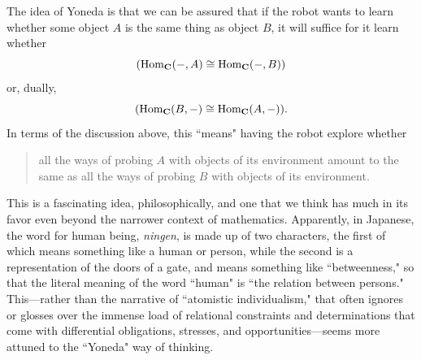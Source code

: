 \documentclass[a4paper]{book}
\theoremstyle{definition}
\theoremstyle{definition}
\theoremstyle{definition}
\theoremstyle{theorem}
\theoremstyle{definition}
\begin{document}
The idea of Yoneda is that we can be assured that if the robot wants to learn whether some object $A$ is the same thing as object $B$, it will suffice for it learn whether
\begin{equation*}
(\text{Hom}_{\textbf{C}}(\--, A) \cong  \text{Hom}_{\textbf{C}}(\--, B))  
\end{equation*} 
or, dually, 
\begin{equation*}
(\text{Hom}_{\textbf{C}}(B, \--) \cong  \text{Hom}_{\textbf{C}}(A, \--)).
\end{equation*}
In terms of the discussion above, this ``means" having the robot explore whether
\begin{quote}
	all the ways of probing $A$ with objects of its environment amount to the same as all the ways of probing $B$ with objects of its environment. 
\end{quote}
This is a fascinating idea, philosophically, and one that we think has much in its favor even beyond the narrower context of mathematics. Apparently, in Japanese, the word for human being, \textit{ningen}, is made up of two characters, the first of which means something like a human or person, while the second is a representation of the doors of a gate, and means something like ``betweenness," so that the literal meaning of the word ``human" is ``the relation between persons." This---rather than the narrative of ``atomistic individualism," that often ignores or glosses over the immense load of relational constraints and determinations that come with differential obligations, stresses, and opportunities---seems more attuned to the ``Yoneda" way of thinking. \par   
\end{document}

